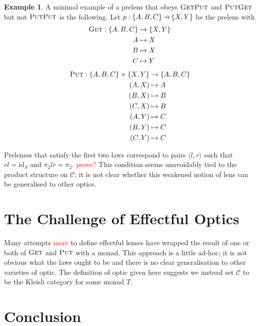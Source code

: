\documentclass[11pt,a4paper]{article}
\theoremstyle{plain}
\theoremstyle{definition}
\newtheorem{example}[theorem]{Example}
\newcommand{\C}{\mathscr{C}}
\newcommand{\id}{\mathrm{id}}
\newcommand{\fget}{\textsc{Get}}
\newcommand{\fput}{\textsc{Put}}
\newcommand{\hto}{\ensuremath{\,\mathaccent\shortmid\rightarrow\,}}
\newcommand{\todo}[1]{\textcolor{red}{\small #1}}
\begin{document}
\begin{example}
A minimal example of a prelens that obeys $\fget\fput$ and $\fput\fget$ but not $\fput\fput$ is the following. Let $p : \{A,B,C\} \hto \{X, Y\}$ be the prelens with
\begin{align*}
\fget : \{A,B,C\} &\to \{X, Y\} \\
A &\mapsto X \\
B &\mapsto X \\
C &\mapsto Y 
\end{align*}
\begin{align*}
\fput : \{A,B,C\} \times \{X, Y\} &\to \{A,B,C\} \\
(A,X) &\mapsto A \\
(B,X) &\mapsto B \\
(C,X) &\mapsto B \\
(A,Y) &\mapsto C \\
(B,Y) &\mapsto C \\
(C,Y) &\mapsto C
\end{align*}
\end{example}

Prelenses that satisfy the first two laws correspond to pairs $\langle l, r \rangle$ such that $rl = \id_S$ and $\pi_2lr = \pi_2$. \todo{prove?} This condition seems unavoidably tied to the product structure on $\C$; it is not clear whether this weakened notion of lens can be generalised to other optics.

\section{The Challenge of Effectful Optics}

Many attempts \cite{ReflectionsOnMonadicLenses} \todo{more} to define effectful lenses have wrapped the result of one or both of $\fget$ and $\fput$ with a monad. This approach is a little ad-hoc; it is not obvious what the laws ought to be and there is no clear generalisation to other varieties of optic. The definition of optic given here suggests we instead set $\C$ to be the Kleisli category for some monad $T$.

\section{Conclusion}



\end{document}
